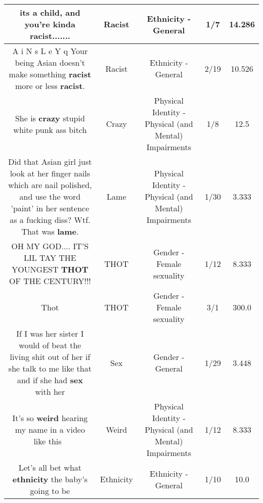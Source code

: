 \documentclass[11pt]{article}
\newlength\mylength
\begin{document}
\begin{center}
\begin{longtable}{|C{.65\mylength}|C{.30\mylength}|C{.12\mylength}|C{.12\mylength}|C{.12\mylength}|}
  \small its a child, and you're kinda \textbf{racist}.......\normalsize   & Racist & Ethnicity - General & 1/7 & 14.286 \\  \hline
  \small A i N s L e Y q Your being Asian doesn't make something \textbf{racist} more or less \textbf{racist}.\normalsize   & Racist & Ethnicity - General & 2/19 & 10.526 \\  \hline
  \small She is \textbf{crazy}   stupid white punk ass bitch\normalsize   & Crazy & Physical Identity - Physical (and Mental) Impairments & 1/8 & 12.5 \\  \hline
  \small Did that Asian girl just look at her finger nails which are nail polished, and use the word 'paint' in her sentence as a fucking diss? Wtf. That was \textbf{lame}.\normalsize   & Lame & Physical Identity - Physical (and Mental) Impairments & 1/30 & 3.333 \\  \hline
  \small OH MY GOD.... IT'S LIL TAY THE YOUNGEST \textbf{THOT} OF THE CENTURY!!!\normalsize   & THOT & Gender - Female sexuality & 1/12 & 8.333 \\  \hline
  \small Thot\normalsize   & THOT & Gender - Female sexuality & 3/1 & 300.0 \\  \hline
  \small If I was her sister I would of beat the living shit out of her if she talk to me like that and if she had \textbf{sex} with her\normalsize   & Sex & Gender - General & 1/29 & 3.448 \\  \hline
  \small It's so \textbf{weird} hearing my name in a video like this 😬\normalsize   & Weird & Physical Identity - Physical (and Mental) Impairments & 1/12 & 8.333 \\  \hline
  \small Let's all bet what \textbf{ethnicity} the baby's going to be\normalsize   & Ethnicity & Ethnicity - General & 1/10 & 10.0 \\  \hline

\end{longtable}
\end{center}
\end{document}
